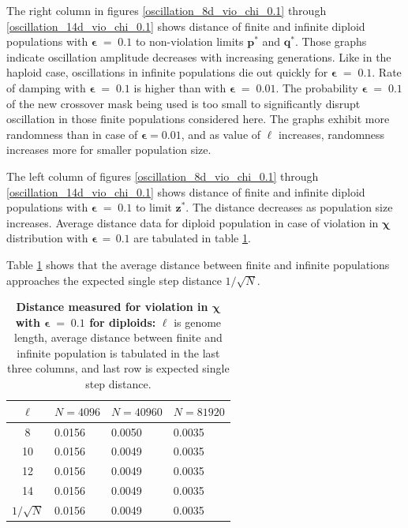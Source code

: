 The right column in figures \ref{oscillation_8d_vio_chi_0.1} through \ref{oscillation_14d_vio_chi_0.1} 
shows distance of finite and infinite diploid populations with $\bm{\epsilon} \;=\; 0.1$ to non-violation limits $\bm{p^\ast}$ and $\bm{q^\ast}$. 
Those graphs indicate 
oscillation amplitude decreases with increasing generations. 
Like in the haploid case, oscillations in infinite populations die out quickly for $\bm{\epsilon} \;=\; 0.1$. 
Rate of damping with $\bm{\epsilon} \;=\; 0.1$ is  
higher than with $\bm{\epsilon} \;=\; 0.01$. The probability $\bm{\epsilon} \;=\; 0.1$ of the new crossover mask   
being used is too small to significantly disrupt oscillation in those finite populations considered here. 
The graphs exhibit more randomness than in case of $\bm{\epsilon} = 0.01$, and as value of $\ell$ 
increases, randomness increases more for smaller population size.

The left column of figures \ref{oscillation_8d_vio_chi_0.1} through \ref{oscillation_14d_vio_chi_0.1} 
shows distance of finite and infinite diploid populations with $\bm{\epsilon} \;=\; 0.1$ to limit $\bm{z^\ast}$. 
The distance decreases as population size increases. 
Average distance data for diploid population in case of violation in $\bm{\chi}$ distribution 
with $\bm{\epsilon} \,=\, 0.1$ are tabulated in table \ref{distanceChiDipEps0.1}. 

Table \ref{distanceChiDipEps0.1} shows that the average distance 
between finite and infinite populations approaches the expected single step distance $1/\sqrt{N}$.  
\clearpage
\begin{table}[h]
\caption[\textbf{Distance measured for violation in $\bm{\chi}$ with $\bm{\epsilon} \;=\; 0.1$ for diploids}]{\textbf{Distance measured for violation in $\bm{\chi}$ with $\bm{\epsilon} \;=\; 0.1$ for diploids:} $\ell$ is genome length, 
average distance between finite and infinite population is tabulated in the last three columns, and last row is expected single step distance.}
\centering
\begin{tabularx}{0.75\textwidth}{ c *{3}{X}}
\toprule
$\ell$ & $N = 4096$ & $N = 40960$ & $N = 81920$  \\
\midrule
8 & 0.0156	&  0.0050	& 0.0035 \\
10 & 0.0156	&  0.0049	& 0.0035 \\
12 & 0.0156	&  0.0049	& 0.0035 \\
14 & 0.0156	&  0.0049	& 0.0035 \\
\midrule
$1/\sqrt{N}$ & 0.0156 & 0.0049 & 0.0035 \\
\bottomrule
\end{tabularx}
\label{distanceChiDipEps0.1}
\end{table} 


